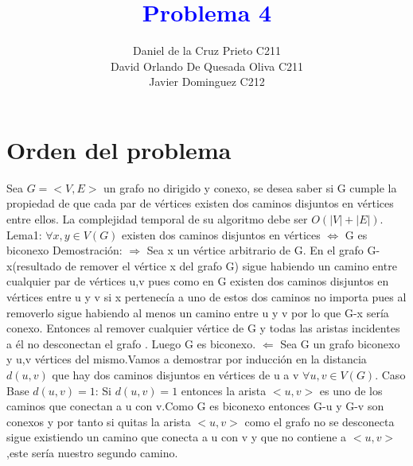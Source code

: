 \documentclass{article}
\begin{document}
    \title{\textcolor{blue}{\textbf{Problema 4 }}\\}
    \author{Daniel de la Cruz Prieto C211\\ David Orlando De Quesada Oliva C211\\Javier Dominguez C212} 
    \date{}
    \maketitle  

    \section*{Orden del problema} 
    Sea $G = <V, E>$ un grafo no dirigido y conexo, se desea saber si G cumple la propiedad de que cada par de
    v\'ertices existen dos caminos disjuntos en v\'ertices entre ellos. La complejidad temporal de su algoritmo debe
    ser $O(|V| + |E|)$.
    \newline
    \newline
    Lema1:\newline
    $\forall x,y\in V(G)$ existen dos caminos disjuntos en v\'ertices $\Longleftrightarrow$ G es biconexo \newline
    \newline
    Demostraci\'on:\newline
    $\Longrightarrow$\newline
    Sea x un v\'ertice arbitrario de G. En el grafo G-x(resultado de remover el v\'ertice x del grafo G)
    sigue habiendo un camino entre cualquier par de v\'ertices u,v pues como en G existen dos caminos disjuntos en v\'ertices
    entre u y v si x pertenec\'ia a uno de estos dos caminos no importa pues al removerlo sigue habiendo al menos un camino 
    entre u y v por lo que G-x ser\'ia conexo. Entonces al remover cualquier v\'ertice de G y todas las aristas incidentes a
    \'el no desconectan el grafo . Luego G es biconexo.\newline
    $\Longleftarrow$\newline
    Sea G un grafo biconexo y u,v v\'ertices del mismo.Vamos a demostrar por inducci\'on en la distancia $d(u,v)$ que hay
    dos caminos disjuntos en v\'ertices de u a v $\forall u,v \in V(G)$.
    \newline
    Caso Base $d(u,v)=1$:\newline
    Si $d(u,v)=1$ entonces la arista $<u,v>$ es uno de los caminos que conectan a u con v.Como G es biconexo entonces 
    G-u y G-v son conexos y por tanto si quitas la  arista $<u,v>$  como el grafo no se desconecta sigue existiendo
    un camino que conecta a u con v y que no contiene a $<u,v>$ ,este ser\'ia nuestro segundo camino.\newline
    
\end{document}
